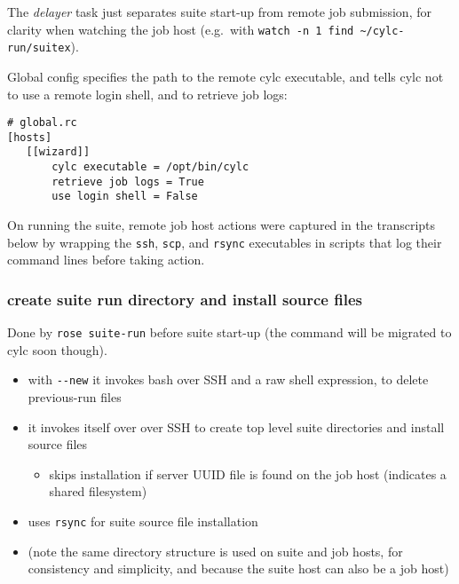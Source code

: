 The {\em delayer} task just separates suite start-up from remote job
submission, for clarity when watching the job host (e.g.\ with
\lstinline=watch -n 1 find ~/cylc-run/suitex=).

Global config specifies the path to the remote cylc executable, and tells cylc
not to use a remote login shell, and to retrieve job logs:
\begin{lstlisting}
# global.rc
[hosts]
   [[wizard]]
       cylc executable = /opt/bin/cylc
       retrieve job logs = True
       use login shell = False
\end{lstlisting}

On running the suite, remote job host actions were captured in the transcripts
below by wrapping the \lstinline=ssh=, \lstinline=scp=, and \lstinline=rsync=
executables in scripts that log their command lines before taking action.

\renewcommand*\DTstylecomment{\normalfont\ttfamily\color{comments}}
\renewcommand*\DTstyle{\bf\ttfamily\textcolor{identifiers}}

\subsubsection{create suite run directory and install source files}

Done by \lstinline=rose suite-run= before suite start-up
(the command will be migrated to cylc soon though).

\begin{itemize}
  \item with \lstinline=--new= it invokes bash over SSH and a raw shell
    expression, to delete previous-run files
  \item it invokes itself over over SSH to create top level suite directories
    and install source files
    \begin{itemize}
      \item skips installation if server UUID file is found on the job host
        (indicates a shared filesystem)
    \end{itemize}
  \item uses \lstinline=rsync= for suite source file installation
  \item (note the same directory structure is used on suite and job hosts, for
    consistency and simplicity, and because the suite host can also be a job host)
\end{itemize}

\lstset{breaklines=true}
\lstset{language=jobhosts}

